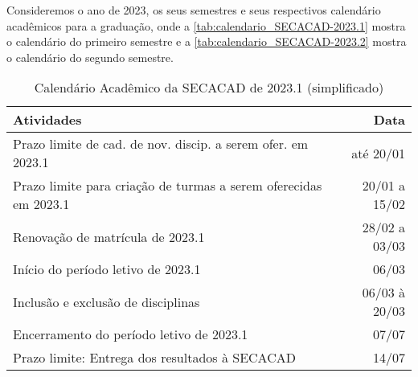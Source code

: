 

Consideremos o ano de 2023, os seus semestres e seus respectivos calendário acadêmicos \cite{Calendario2023_1,Calendario2023_2} para a graduação, onde a \autoref{tab:calendario_SECACAD-2023.1} mostra o calendário do primeiro semestre e a \autoref{tab:calendario_SECACAD-2023.2} mostra o calendário do segundo semestre.

\begin{table}[H] \centering \caption{Calendário Acadêmico da SECACAD de 2023.1 (simplificado)} \label{tab:calendario_SECACAD-2023.1}
  \begin{tabular}{| l r |}
    \hline
    \textbf{Atividades}                                              & \textbf{Data} \\
    \hline
    Prazo limite de cad. de nov. discip. a serem ofer. em 2023.1     & até 20/01     \\
    Prazo limite para criação de turmas a serem oferecidas em 2023.1 & 20/01 a 15/02 \\
    Renovação de matrícula de 2023.1                                 & 28/02 a 03/03 \\
    Início do período letivo de 2023.1                               & 06/03         \\
    Inclusão e exclusão de disciplinas                               & 06/03 à 20/03 \\
    Encerramento do período letivo de 2023.1                         & 07/07         \\
    Prazo limite: Entrega dos resultados à SECACAD                   & 14/07         \\
    \hline
  \end{tabular}
\end{table}

